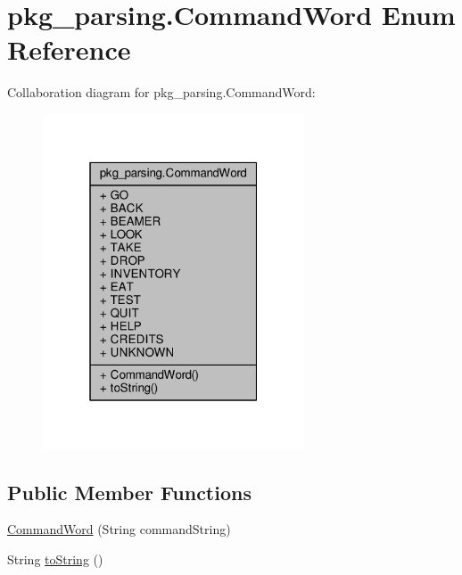 \hypertarget{enumpkg__parsing_1_1CommandWord}{\section{pkg\-\_\-parsing.\-Command\-Word Enum Reference}
\label{enumpkg__parsing_1_1CommandWord}
}


Collaboration diagram for pkg\-\_\-parsing.\-Command\-Word\-:
\nopagebreak
\begin{figure}[H]
\begin{center}
\leavevmode
\includegraphics[width=220pt]{enumpkg__parsing_1_1CommandWord__coll__graph}
\end{center}
\end{figure}
\subsection*{Public Member Functions}
\begin{DoxyCompactItemize}
\item 
\hyperlink{enumpkg__parsing_1_1CommandWord_a7ff71159ae2c26835f5336580152d088}{Command\-Word} (String command\-String)
\item 
String \hyperlink{enumpkg__parsing_1_1CommandWord_ab6d70b61b7418ce7dfa930bda64132c5}{to\-String} ()
\end{DoxyCompactItemize}
